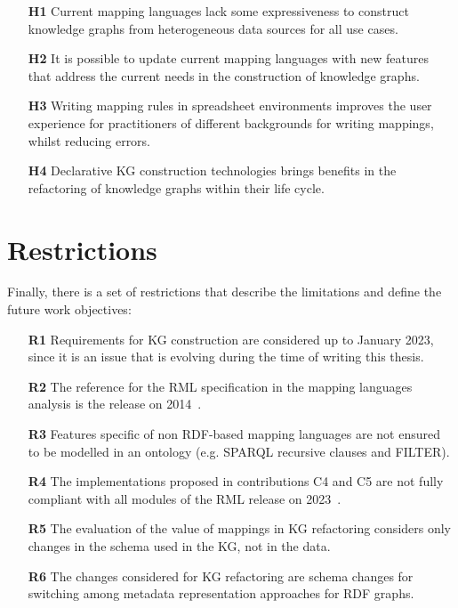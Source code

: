 \begin{enumerate}
    \item[\textbf{H1}] Current mapping languages lack some expressiveness to construct knowledge graphs from heterogeneous data sources for all use cases.
    \item[\textbf{H2}] It is possible to update  current mapping languages with new features that address the current needs in the construction of knowledge graphs.
    \item[\textbf{H3}] Writing mapping rules in spreadsheet environments improves the user experience for practitioners of different backgrounds for writing mappings, whilst reducing errors. 
    \item[\textbf{H4}] Declarative KG construction technologies brings benefits in the refactoring of knowledge graphs within their life cycle.
\end{enumerate}


\section{Restrictions}
\label{sec:chp3-restrictions}

Finally, there is a set of restrictions that describe the limitations and define the future work objectives:

\begin{enumerate}
    \item[\textbf{R1}] Requirements for KG construction are considered up to January 2023, since it is an issue that is evolving during the time of writing this thesis.
    \item[\textbf{R2}] The reference for the RML specification in the mapping languages analysis is the release on 2014~\parencite{Dimou2014rml}.
    \item[\textbf{R3}] Features specific of non RDF-based mapping languages are not ensured to be modelled in an ontology (e.g. SPARQL recursive clauses and FILTER).
    \item[\textbf{R4}] The implementations proposed in contributions C4 and C5 are not fully compliant with all modules of the RML release on 2023~\parencite{iglesias2023rml}. 
    \item[\textbf{R5}] The evaluation of the value of mappings in KG refactoring considers only changes in the schema used in the KG, not in the data.
    \item[\textbf{R6}] The changes considered for KG refactoring are schema changes for switching among metadata representation approaches for RDF graphs.
\end{enumerate}


